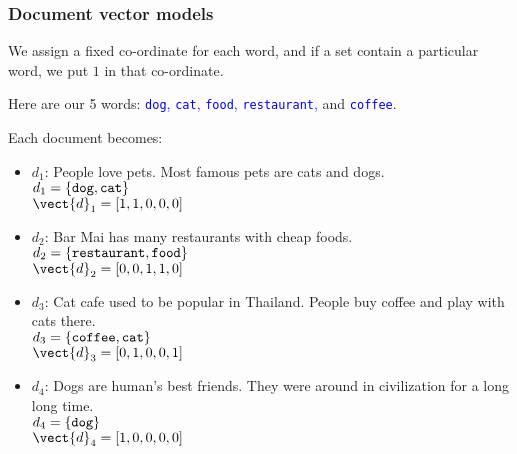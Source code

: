 \begin{frame}
  \frametitle{Document vector models}

  We assign a fixed co-ordinate for each word, and if a set contain a particular word, we put $1$ in that co-ordinate.

  \pause Here are our 5 words: \textcolor{blue}{{\tt dog}, {\tt cat},
    {\tt food}, {\tt restaurant},} and \textcolor{blue}{\tt coffee}.

  Each document becomes:

  \begin{itemize}
  \item $d_1$: {\tiny People love pets.  Most famous pets are cats and
    dogs.} \\
    $d_1=\{\mbox{\tt dog}, \mbox{\tt cat}\}$ \\
    \pause $\vect{d}_1=[1,1,0,0,0]$
    \pause
  \item $d_2$: {\tiny Bar Mai has many restaurants with cheap foods.} \\
    $d_2=\{\mbox{\tt restaurant}, \mbox{\tt food}\}$\\
    \pause $\vect{d}_2=[0,0,1,1,0]$
    \pause
  \item $d_3$: {\tiny Cat cafe used to be popular in Thailand.  People
    buy coffee and play with cats there.} \\
    $d_3=\{\mbox{\tt coffee}, \mbox{\tt cat}\}$ \\
    \pause $\vect{d}_3=[0,1,0,0,1]$
    \pause
  \item $d_4$: {\tiny Dogs are human's best friends.  They were around
    in civilization for a long long time.} \\
    $d_4=\{\mbox{\tt dog}\}$\\
    \pause $\vect{d}_4=[1,0,0,0,0]$
  \end{itemize}

\end{frame}

